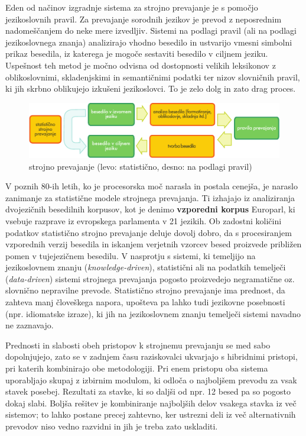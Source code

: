 \begin{multicols}{2}
Eden od načinov izgradnje sistema za stroj\-no prevajanje je s pomočjo jezikoslovnih pravil. Za prevajanje sorodnih jezikov je prevod z neposrednim nadomeščanjem do neke mere izvedljiv. Sistemi na podlagi pravil (ali na podlagi jezikoslovnega znanja) analizirajo vhodno besedilo in ustvarijo vmesni simbolni prikaz besedila, iz katerega je mogoče sestaviti besedilo v ciljnem jeziku. Uspešnost teh metod je močno odvisna od dostopnosti velikih leksikonov z oblikoslovnimi, skladenjskimi in semantičnimi podatki ter nizov slovničnih pravil, ki jih skrbno oblikujejo izkušeni jezikoslovci. To je zelo dolg in zato drag proces.

\begin{figure}[htb]
  \center
  \includegraphics[width=\textwidth]{../_media/slovene/machine_translation}
  \caption{strojno prevajanje (levo: statistično, desno: na podlagi pravil)}
  \label{fig:mtarch_de}
\end{figure}

V poznih 80-ih letih, ko je procesorska moč narasla in postala cenej\-ša, je naraslo zanimanje za statistične mo\-dele stroj\-nega prevajanja. Ti izhajajo iz analiziranja dvojezičnih besedilnih korpusov, kot je denimo \textbf{vzporedni korpus} Europarl, ki vsebuje razprave iz evropskega parlamenta v 21 jezikih. Ob zadostni količini podatkov statistično stroj\-no prevajanje deluje dovolj dobro, da s procesiranjem vzporednih verzij besedila in iskanjem verjetnih vzorcev besed proizvede približen po\-men v tujejezičnem besedilu. V nasprotju s sistemi, ki temeljijo na jezikoslovnem znanju (\textit{knowledge-driven}), statistični ali na podatkih temelječi (\textit{data-driven}) sistemi stroj\-nega prevajanja pogosto proizvedejo negramatične oz. slovnično nepravilne prevode. Statistično stroj\-no prevajanje ima prednost, da zah\-teva manj človeškega napora, upošteva pa lahko tudi jezikovne posebnosti (npr. idiomatske izraze), ki jih na jezikoslovnem znanju temelječi sistemi navadno ne zaznavajo.

Prednosti in slabosti obeh pristopov k stroj\-nemu prevajanju se med sabo dopolnjujejo, zato se v zadnjem času raziskovalci ukvarjajo s hibridnimi pristopi, pri katerih kombinirajo obe metodologiji. Pri enem pristopu oba sistema uporab\-ljajo skupaj z izbirnim modulom, ki odloča o naj\-boljšem prevodu za vsak stavek posebej. Rezultati za stavke, ki so daljši od npr. 12 besed pa so pogosto dokaj slabi. Boljša rešitev je kombiniranje naj\-boljših delov vsakega stavka iz več sistemov; to lahko postane precej zah\-tevno, ker ustrezni deli iz več alternativnih prevodov niso vedno razvidni in jih je treba zato uskladiti.


\end{multicols}
